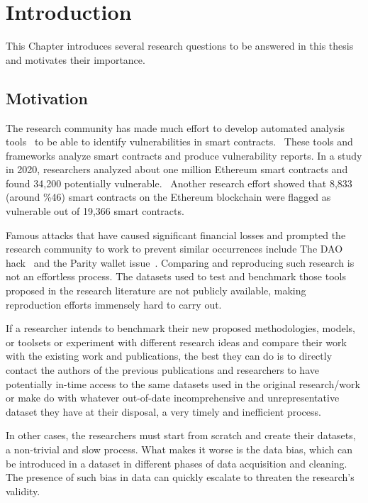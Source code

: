 \chapter{Introduction}

  This Chapter introduces several research questions to be answered in this thesis and motivates their importance.

\section{Motivation}
  The research community has made much effort to develop automated analysis tools~\cite{ref_tools} to be able to identify vulnerabilities in smart contracts.~\cite{ref_tools}
  These tools and frameworks analyze smart contracts and produce vulnerability reports.
  In a study in 2020, researchers analyzed about one million Ethereum smart contracts and found 34,200 potentially vulnerable.~\cite{ref_flag1}
  Another research effort showed that 8,833 (around \%46) smart contracts on the Ethereum blockchain were flagged as vulnerable out of 19,366 smart contracts.~\cite{ref_flag2}

  Famous attacks that have caused significant financial losses and prompted the research community to work to prevent similar occurrences include The DAO hack~\cite{dao} and the Parity wallet issue~\cite{ref_parity}.
  Comparing and reproducing such research is not an effortless process.
  The datasets used to test and benchmark those tools proposed in the research literature are not publicly available, making reproduction efforts immensely hard to carry out.

  If a researcher intends to benchmark their new proposed methodologies, models, or toolsets or experiment with different research ideas and compare their work with the existing work and publications,
  the best they can do is to directly contact the authors of the previous publications and researchers to have potentially in-time access to the same datasets used in the original
  research/work or make do with whatever out-of-date incomprehensive and unrepresentative dataset they have at their disposal, a very timely and inefficient process.~\cite{ref_flag2}

  In other cases, the researchers must start from scratch and create their datasets, a non-trivial and slow process.
  What makes it worse is the data bias, which can be introduced in a dataset in different phases of data acquisition and cleaning.
  The presence of such bias in data can quickly escalate to threaten the research's validity.~\cite{Empirical-Evaluation-of-Smart-Contract-Testing:What-is-the-Best-Choice}

